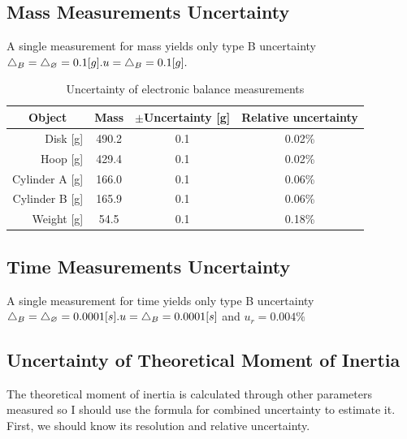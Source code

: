 \documentclass[12pt]{article}
\begin{document}
\subsection{Mass Measurements Uncertainty}
A single measurement for mass yields only type B uncertainty $\bigtriangleup_B=\bigtriangleup_\varnothing=0.1[g]. \\u=\bigtriangleup_B=0.1[g].$
\begin{table}[H]
\centering

\begin{tabular}{|r|c|c|c|}
\hline
\multicolumn{1}{|c|}{Object} & Mass  & $\pm$Uncertainty {[}g{]} & Relative uncertainty \\ \hline
Disk {[}g{]}                 & 490.2 & 0.1                      & 0.02\%               \\ \hline
Hoop {[}g{]}                 & 429.4 & 0.1                      & 0.02\%               \\ \hline
Cylinder A {[}g{]}           & 166.0 & 0.1                      & 0.06\%               \\ \hline
Cylinder B {[}g{]}           & 165.9 & 0.1                      & 0.06\%               \\ \hline
Weight {[}g{]}               & 54.5  & 0.1                      & 0.18\%               \\ \hline
\end{tabular}
\caption{Uncertainty of electronic balance measurements}
\end{table}

\subsection{Time Measurements Uncertainty}
A single measurement for time yields only type B uncertainty $\bigtriangleup_B=\bigtriangleup_\varnothing=0.0001[s]. \\u=\bigtriangleup_B=0.0001[s]$ and $u_r=0.004\%$
\subsection{Uncertainty of Theoretical Moment of Inertia}
The theoretical moment of inertia is calculated through other parameters measured so I should use the formula for combined uncertainty to estimate it. First, we should know its resolution and relative uncertainty.
\end{document}
